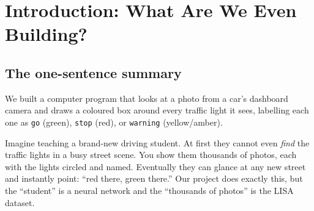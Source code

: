 \maketitle

\begin{abstract}
\noindent
This document teaches, from absolute zero, how a working traffic-light
\emph{detector} was built in the project notebook
\texttt{traffic-light-model.ipynb}. It explains the theory (what a
convolutional neural network is, what object detection means, how the
YOLOv8 architecture works, and what every evaluation metric means) and
the practice (how the data was cleaned, converted, split, balanced,
trained, evaluated, and exported). Every number quoted here is taken
directly from the project's own files: \texttt{runs/traffic\_light\_v1/results.csv},
\texttt{args.yaml}, \texttt{yolo\_dataset/data.yaml}, and the captured
notebook outputs. The final model is a fine-tuned \textbf{YOLOv8s}
network that maps the LISA dataset's $14$ raw labels down to
$3$ classes (\texttt{go}, \texttt{stop}, \texttt{warning}) and reaches a
best validation \textbf{mAP@0.5 of 0.768} at epoch~27. The last chapter is
a dedicated viva-preparation section with model answers to the questions
an examiner is most likely to ask.
\end{abstract}

\tableofcontents

\chapter{Introduction: What Are We Even Building?}
\label{ch:intro}

\section{The one-sentence summary}
We built a computer program that looks at a photo from a car's
dashboard camera and draws a coloured box around every traffic light it
sees, labelling each one as \texttt{go} (green), \texttt{stop} (red), or
\texttt{warning} (yellow/amber).

\begin{analogy}
Imagine teaching a brand-new driving student. At first they cannot even
\emph{find} the traffic lights in a busy street scene. You show them
thousands of photos, each with the lights circled and named. Eventually
they can glance at any new street and instantly point: ``red there,
green there.'' Our project does exactly this, but the ``student'' is a
neural network and the ``thousands of photos'' is the LISA dataset.
\end{analogy}

